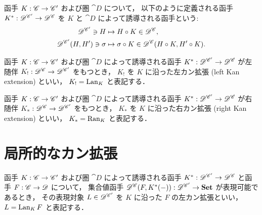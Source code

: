 \documentclass[titlepage]{ltjsreport}
\begin{document}
\begin{definition}[函手の誘導]
  \def\C{\cat{C}}%
  \def\A{\cat{C'}}%
  \def\D{\cat{D}}%
  \def\K{K}%
  \def\h{H}%
  函手 $\mrp{\K}{\C}{\A}$ および圏 $\D$ について，
  以下のように定義される函手 $\mrp{\K^*}{\D^\A}{\D^\C}$ を
  $\K$ と $\D$ によって誘導される函手という:
  \begin{align}
    \objs{\D^\A}\ni\h
     & \mapsto\h\circ\K\in\objs{\D^\C},                            \\
    \mrps{\D^\A}{\h}{\h'}\ni\sigma
     & \mapsto\sigma\circ\K\in\mrps{\D^\C}{\h\circ\K}{\h'\circ\K}.
  \end{align}
\end{definition}
\begin{definition}
  \def\C{\cat{C}}%
  \def\A{\cat{C'}}%
  \def\D{\cat{D}}%
  \def\K{K}%
  \def\L{\K_!}%
  函手 $\mrp{\K}{\C}{\A}$ および圏 $\D$ によって誘導される函手
  $\mrp{\K^*}{\D^\A}{\D^\C}$ が左随伴 $\mrp{\L}{\D^\C}{\D^\A}$ をもつとき，
  $\L$ を $\K$ に沿った左カン拡張 (left Kan extension) といい，
  $\L=\lan_{\K}$ と表記する．
\end{definition}
\begin{definition}
  \def\C{\cat{C}}%
  \def\A{\cat{C'}}%
  \def\D{\cat{D}}%
  \def\K{K}%
  \def\R{\K_*}%
  函手 $\mrp{\K}{\C}{\A}$ および圏 $\D$ によって誘導される函手
  $\mrp{\K^*}{\D^\A}{\D^\C}$ が右随伴 $\mrp{\R}{\D^\C}{\D^\A}$ をもつとき，
  $\R$ を $\K$ に沿った右カン拡張 (right Kan extension) といい，
  $\R=\ran_{\K}$ と表記する．
\end{definition}

\section{局所的なカン拡張}

\begin{definition}
  \def\C{\cat{C}}%
  \def\A{\cat{C'}}%
  \def\D{\cat{D}}%
  \def\K{K}%
  \def\F{F}%
  函手 $\mrp{\K}{\C}{\A}$ および圏 $\D$ によって誘導される函手
  $\mrp{\K^*}{\D^\A}{\D^\C}$ と函手 $\mrp{\F}{\C}{\D}$ について，
  集合値函手 $\mrp{\mrps{\D^\C}{\F}{\K^*(-)}}{\D^\A}{\set}$ が表現可能であるとき，
  その表現対象 $L\in\objs{\D^\A}$ を $\K$ に沿った $\F$ の左カン拡張といい，
  $L=\lan_{\K}\F$ と表記する．
  \begin{center}
    
  \end{center}
\end{definition}
\end{document}
